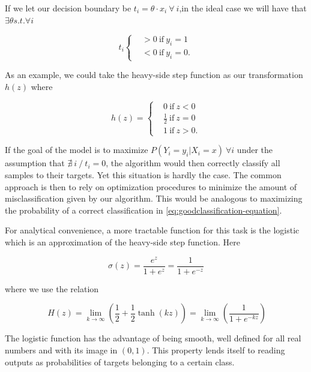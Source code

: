 If we let our decision boundary be $ t_i = \theta \cdot x_i \ \forall \ i $,in the ideal case we will have that $\exists \theta s.t. \forall i $

\begin{equation}
t_i
\begin{cases}
&>0 \ \mbox{if} \ y_i=1 \\
&<0 \ \mbox{if} \ y_i=0.
\end{cases}
\end{equation}

As an example, we could take the heavy-side step function as our transformation $h(z)$ where

\begin{equation}
h(z) =
\begin{cases}
&0 \ \mbox{if} \ z<0 \\
&\frac{1}{2} \ \mbox{if} \ z=0 \\
&1 \ \mbox{if} \ z>0.
\end{cases}
\end{equation}

If the goal of the model is to maximize $P(Y_i = y_i | X_i = x) \ \forall i$
under the assumption that $\nexists\ i \ / \ t_i = 0$, the algorithm would then correctly classify all samples to their targets. Yet this situation is hardly the case. The common approach is then to rely on optimization procedures to minimize the amount of misclassification given by our algorithm. This would be analogous to maximizing the probability of a correct classification in \cref{eq:goodclassification-equation}.

For analytical convenience, a more tractable function for this task is the logistic which is an approximation of the heavy-side step function. Here

\begin{equation}\label{eq:logisticFunction}
\sigma(z) = \frac{e^{z}}{1 + e^{z}} = \frac{1}{1 + e^{-z}}
\end{equation}

where we use the relation

\begin{equation}
 \ H(z) = \lim_{k \to \infty} \left(\frac{1}{2} + \frac{1}{2}\tanh(kz) \right) = \lim_{k \to \infty} \left(\frac{1}{1+e^{-kz}} \right)
\end{equation}

The logistic function has the advantage of being smooth, well defined for all real numbers and with its image in $(0,1)$. This property lends itself to reading outputs as probabilities of targets belonging to a certain class.

